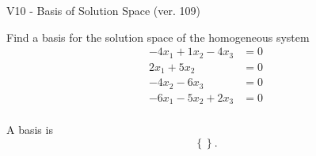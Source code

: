 \begin{exercise}
  \begin{exerciseTitle}V10 - Basis of Solution Space (ver. 109)\end{exerciseTitle}
  \begin{exerciseStatement}
    Find a basis for the solution space of the homogeneous system 
\begin{align*}
 -4 x_ 1 + 1 x_ 2 -4 x_ 3 &= 0  \\ 
  2 x_ 1 + 5 x_ 2 &= 0  \\ 
  -4 x_ 2 -6 x_ 3 &= 0  \\ 
  -6 x_ 1 -5 x_ 2 + 2 x_ 3 &= 0  \\ 
 \end{align*}


 
  \end{exerciseStatement}

  \begin{exerciseAnswer}
   A basis is   
\[\left\{\right\}.\]

  


  \end{exerciseAnswer}
\end{exercise}